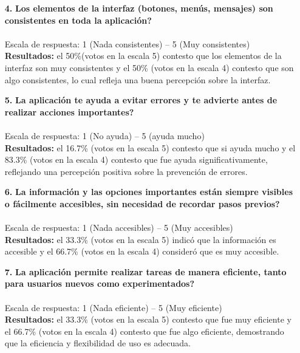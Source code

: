 \begin{enumerate}
\item[\textbf{4.}] \textbf{\textquestiondown Los elementos de la interfaz (botones, menús, mensajes) son consistentes en toda la aplicación?} \\\\
Escala de respuesta: 1 (Nada consistentes) -- 5 (Muy consistentes)\\

\textbf{Resultados: } el 50\%(votos en la escala 5) contesto que los elementos de la interfaz son muy consistentes y el 50\% (votos en la escala 4) contesto que son algo consistentes, lo cual refleja una buena percepción sobre la interfaz.
\\

\item[\textbf{5.}] \textbf{\textquestiondown La aplicación te ayuda a evitar errores y te advierte antes de realizar acciones importantes?} \\\\
Escala de respuesta: 1 (No ayuda) -- 5 (ayuda mucho)\\

\textbf{Resultados: } el 16.7\% (votos en la escala 5) contesto que si ayuda mucho y el 83.3\% (votos en la escala 4) contesto que fue ayuda significativamente, reflejando una percepción positiva sobre la prevención de errores.
\\

\item[\textbf{6.}] \textbf{\textquestiondown La información y las opciones importantes están siempre visibles o fácilmente accesibles, sin necesidad de recordar pasos previos?} \\\\
Escala de respuesta: 1 (Nada accesibles) -- 5 (Muy accesibles)\\

\textbf{Resultados: } el 33.3\% (votos en la escala 5) indicó que la información es accesible y el 66.7\% (votos en la escala 4) consideró que es muy accesible.
\\

\item[\textbf{7.}] \textbf{\textquestiondown La aplicación permite realizar tareas de manera eficiente, tanto para usuarios nuevos como experimentados?} \\\\
Escala de respuesta: 1 (Nada eficiente) -- 5 (Muy eficiente)\\

\textbf{Resultados: } el 33.3\% (votos en la escala 5) contesto que fue muy eficiente y el 66.7\% (votos en la escala 4) contesto que fue algo eficiente, demostrando que la eficiencia y flexibilidad de uso es adecuada.
\\


\end{enumerate}
